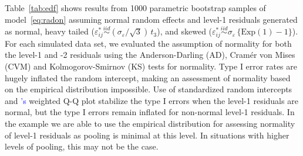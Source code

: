 \documentclass{article} %
\newcommand{\citetapos}[1]{\citeauthor{#1}{\textcolor{blue}{'s}} }
\begin{document}
%
%
%
%
Table~\ref{tab:edf} shows results from 1000 parametric bootstrap samples of model~\eqref{eq:radon} assuming normal random effects and level-1 residuals generated as normal, heavy tailed ($\varepsilon_{ij}^* \overset{iid}{\sim} (\sigma_{\varepsilon} / \sqrt{3})\, t_3$), and skewed ($\varepsilon_{ij}^* \overset{iid}{\sim} \sigma_{\varepsilon} \, \{ \text{Exp}(1) - 1 \}$).
For each simulated data set, we evaluated the assumption of normality for both the level-1 and -2 residuals using the Anderson-Darling (AD), Cram{\'e}r von Mises (CVM) and  Kolmogorov-Smirnov (KS) tests for normality.  
Type I error rates are hugely inflated the random intercept, making an assessment of normality based on the empirical distribution impossible. Use of standardized random intercepts and \citetapos{Lange:1989uu} weighted Q-Q plot stabilize the type I errors when the level-1 residuals are normal, but the type I errors remain inflated for non-normal level-1 residuals.
In the example we are able to use the empirical distribution for assessing normality of  level-1 residuals  as  pooling is minimal at this level. In situations with higher levels of pooling, this may not be the case.
\end{document}
